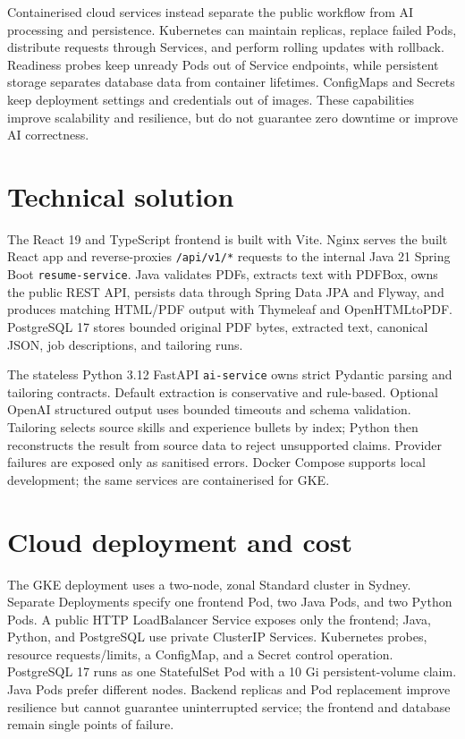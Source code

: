 \documentclass[10pt,a4paper]{article}
\begin{document}
Containerised cloud services instead separate the public workflow from AI processing and persistence. Kubernetes can maintain replicas, replace failed Pods, distribute requests through Services, and perform rolling updates with rollback. Readiness probes keep unready Pods out of Service endpoints, while persistent storage separates database data from container lifetimes. ConfigMaps and Secrets keep deployment settings and credentials out of images. These capabilities improve scalability and resilience, but do not guarantee zero downtime or improve AI correctness.

\section{Technical solution}
The React 19 and TypeScript frontend is built with Vite. Nginx serves the built React app and reverse-proxies \texttt{/api/v1/*} requests to the internal Java 21 Spring Boot \texttt{resume-service}. Java validates PDFs, extracts text with PDFBox, owns the public REST API, persists data through Spring Data JPA and Flyway, and produces matching HTML/PDF output with Thymeleaf and OpenHTMLtoPDF. PostgreSQL 17 stores bounded original PDF bytes, extracted text, canonical JSON, job descriptions, and tailoring runs.

The stateless Python 3.12 FastAPI \texttt{ai-service} owns strict Pydantic parsing and tailoring contracts. Default extraction is conservative and rule-based. Optional OpenAI structured output uses bounded timeouts and schema validation. Tailoring selects source skills and experience bullets by index; Python then reconstructs the result from source data to reject unsupported claims. Provider failures are exposed only as sanitised errors. Docker Compose supports local development; the same services are containerised for GKE.

\newpage

\section{Cloud deployment and cost}
The GKE deployment uses a two-node, zonal Standard cluster in Sydney. Separate Deployments specify one frontend Pod, two Java Pods, and two Python Pods. A public HTTP LoadBalancer Service exposes only the frontend; Java, Python, and PostgreSQL use private ClusterIP Services. Kubernetes probes, resource requests/limits, a ConfigMap, and a Secret control operation. PostgreSQL 17 runs as one StatefulSet Pod with a 10 Gi persistent-volume claim. Java Pods prefer different nodes. Backend replicas and Pod replacement improve resilience but cannot guarantee uninterrupted service; the frontend and database remain single points of failure.
\end{document}
